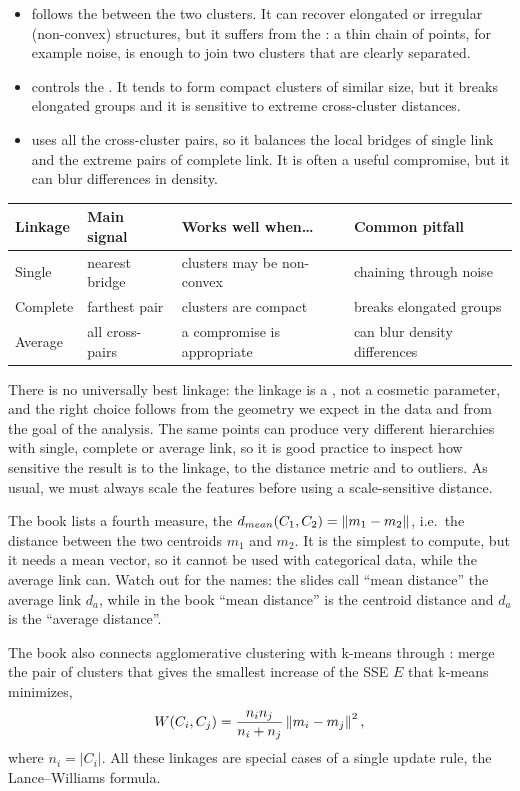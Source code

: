 \begin{itemize}
  \item {} follows the  between the two clusters. It can recover elongated or irregular (non-convex) structures, but it suffers from the : a thin chain of points, for example noise, is enough to join two clusters that are clearly separated.
  \item {} controls the . It tends to form compact clusters of similar size, but it breaks elongated groups and it is sensitive to extreme cross-cluster distances.
  \item {} uses all the cross-cluster pairs, so it balances the local bridges of single link and the extreme pairs of complete link. It is often a useful compromise, but it can blur differences in density.
\end{itemize}

\begin{center}
\begin{tabular}{@{}llll@{}}
\toprule
Linkage & Main signal & Works well when\dots & Common pitfall \\
\midrule
Single & nearest bridge & clusters may be non-convex & chaining through noise \\
Complete & farthest pair & clusters are compact & breaks elongated groups \\
Average & all cross-pairs & a compromise is appropriate & can blur density differences \\
\bottomrule
\end{tabular}
\end{center}

There is no universally best linkage: the linkage is a , not a cosmetic parameter, and the right choice follows from the geometry we expect in the data and from the goal of the analysis. The same points can produce very different hierarchies with single, complete or average link, so it is good practice to inspect how sensitive the result is to the linkage, to the distance metric and to outliers. As usual, we must always scale the features before using a scale-sensitive distance.

\begin{remark}
The book lists a fourth measure, the  $d_{mean}(C_1, C_2) = \left\lVert m_1 - m_2 \right\rVert$, i.e.\ the distance between the two centroids $m_1$ and $m_2$. It is the simplest to compute, but it needs a mean vector, so it cannot be used with categorical data, while the average link can. Watch out for the names: the slides call ``mean distance'' the average link $d_a$, while in the book ``mean distance'' is the centroid distance and $d_a$ is the ``average distance''.

The book also connects agglomerative clustering with k-means through : merge the pair of clusters that gives the smallest increase of the SSE $E$ that k-means minimizes,
\[
  W(C_i, C_j) = \frac{n_i n_j}{n_i + n_j} \left\lVert m_i - m_j \right\rVert^2,
\]
where $n_i = |C_i|$. All these linkages are special cases of a single update rule, the Lance--Williams formula.
\end{remark}

